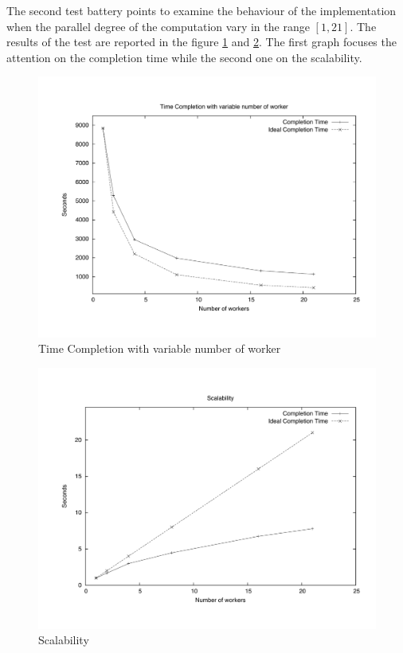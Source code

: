 The second test battery points to examine the behaviour of the implementation when the parallel degree of the computation vary in the range $[1, 21]$. The results of the test are reported in the figure \ref{NTime}  and \ref{NScal}. The first graph focuses the attention on the completion time while the second one on the scalability.


\begin{figure}[th]
	\centerline{
		\mbox{\includegraphics[scale=0.48]{HadoopTest/PsFiles/NTime.pdf}}
	}
	\caption{Time Completion with variable number of worker} 
        \label{NTime}
\end{figure}

\begin{figure}[th]
	\centerline{
		\mbox{\includegraphics[scale=0.48]{HadoopTest/PsFiles/NScal.pdf}}
	}
	\caption{Scalability} 
        \label{NScal}
\end{figure}

